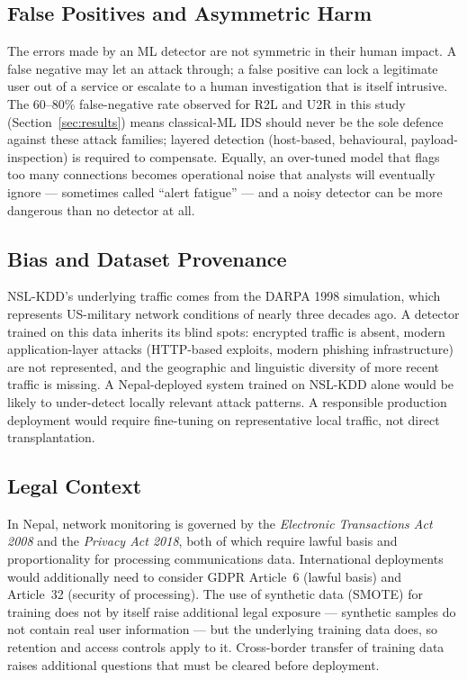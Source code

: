 \documentclass[11pt, a4paper]{article}
\begin{document}
\subsection{False Positives and Asymmetric Harm}
The errors made by an ML detector are not symmetric in their human impact. A false negative may let an attack through; a false positive can lock a legitimate user out of a service or escalate to a human investigation that is itself intrusive. The 60--80\% false-negative rate observed for R2L and U2R in this study (Section~\ref{sec:results}) means classical-ML IDS should never be the sole defence against these attack families; layered detection (host-based, behavioural, payload-inspection) is required to compensate. Equally, an over-tuned model that flags too many connections becomes operational noise that analysts will eventually ignore --- sometimes called ``alert fatigue'' --- and a noisy detector can be more dangerous than no detector at all.

\subsection{Bias and Dataset Provenance}
NSL-KDD's underlying traffic comes from the DARPA 1998 simulation, which represents US-military network conditions of nearly three decades ago. A detector trained on this data inherits its blind spots: encrypted traffic is absent, modern application-layer attacks (HTTP-based exploits, modern phishing infrastructure) are not represented, and the geographic and linguistic diversity of more recent traffic is missing. A Nepal-deployed system trained on NSL-KDD alone would be likely to under-detect locally relevant attack patterns. A responsible production deployment would require fine-tuning on representative local traffic, not direct transplantation.

\subsection{Legal Context}
In Nepal, network monitoring is governed by the \emph{Electronic Transactions Act 2008} and the \emph{Privacy Act 2018}, both of which require lawful basis and proportionality for processing communications data. International deployments would additionally need to consider GDPR Article~6 (lawful basis) and Article~32 (security of processing). The use of synthetic data (SMOTE) for training does not by itself raise additional legal exposure --- synthetic samples do not contain real user information --- but the underlying training data does, so retention and access controls apply to it. Cross-border transfer of training data raises additional questions that must be cleared before deployment.
\end{document}
